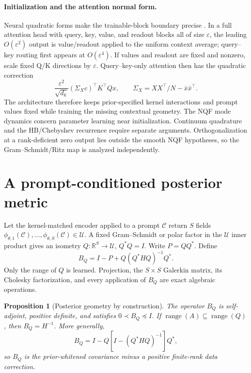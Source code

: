 \documentclass[11pt,a4paper]{article}
\numberwithin{equation}{section}
\newtheorem{proposition}[theorem]{Proposition}
\theoremstyle{definition}
\theoremstyle{remark}
\newcommand{\R}{\mathbb R}
\newcommand{\calU}{\mathcal U}
\newcommand{\calC}{\mathcal C}
\newcommand{\range}{\operatorname{range}}
\begin{document}
\paragraph{Initialization and the attention normal form.}
Neural quadratic forms make the trainable-block boundary precise
\citep{ziyin2026neuralquadraticforms}.  In a full attention head with query,
key, value, and readout blocks all of size $\varepsilon$, the leading
$O(\varepsilon^2)$ output is value/readout applied to the uniform context
average; query--key routing first appears at $O(\varepsilon^4)$.  If values
and readout are fixed and nonzero, scale fixed Q/K directions by
\(\varepsilon\). Query--key-only attention then has the quadratic correction
\[
 \frac{\varepsilon^2}{\sqrt{d_k}}(\Sigma_Xc)^\top K^\top Qx,
 \qquad
 \Sigma_X=XX^\top/N-\bar x\bar x^\top.
\]
The architecture therefore keeps prior-specified kernel interactions and
prompt values fixed while training the missing contextual geometry. The NQF
mode dynamics concern parameter learning near initialization. Continuum
quadrature and the HB/Chebyshev recurrence require separate arguments.
Orthogonalization at a rank-deficient zero output lies outside the smooth NQF
hypotheses, so the Gram--Schmidt/Ritz map is analyzed independently.

\section{A prompt-conditioned posterior metric}
\label{sec:metric}

Let the kernel-matched encoder applied to a prompt $\calC$ return $S$ fields
$\phi_{\theta,1}(\calC),\ldots,\phi_{\theta,S}(\calC)\in\calU$.  A fixed
Gram--Schmidt or polar factor in the $\calU$ inner product gives an isometry
$Q:\R^S\to\calU$, $Q^*Q=I$.  Write $P=QQ^*$.  Define
\begin{equation}
 B_Q=I-P+Q(Q^*HQ)^{-1}Q^*.
 \label{eq:ritz-metric}
\end{equation}
Only the range of $Q$ is learned.  Projection, the $S\times S$ Galerkin
matrix, its Cholesky factorization, and every application of $B_Q$ are exact
algebraic operations.

\begin{proposition}[Posterior geometry by construction]
\label{prop:spd}
The operator $B_Q$ is self-adjoint, positive definite, and satisfies
$0\prec B_Q\preceq I$.  If $\range(A)\subseteq\range(Q)$, then
$B_Q=H^{-1}$.  More generally,
\begin{equation}
 B_Q=I-Q\left[I-(Q^*HQ)^{-1}\right]Q^*,
 \label{eq:negative-correction}
\end{equation}
so $B_Q$ is the prior-whitened covariance minus a positive finite-rank data
correction.
\end{proposition}
\end{document}
